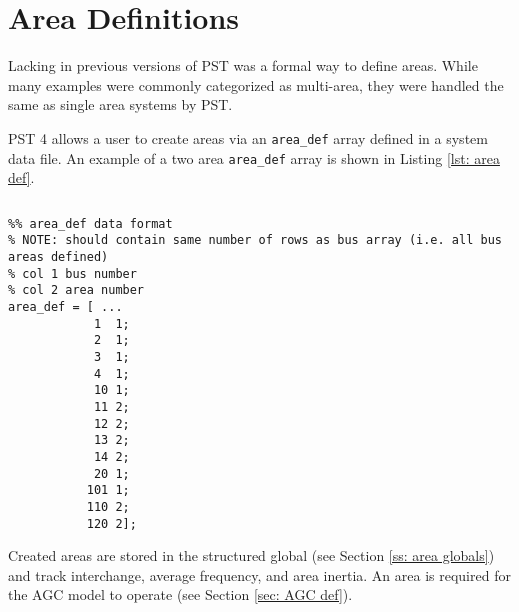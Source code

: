 \section{Area Definitions}  
Lacking in previous versions of PST was a formal way to define areas.
While many examples were commonly categorized as multi-area, they were handled the same as single area systems by PST.

PST 4 allows a user to create areas via an \verb|area_def| array defined in a system data file.
An example of a two area \verb|area_def| array is shown in Listing \ref{lst: area def}.

\begin{lstlisting}[caption={Area Definition Example},label={lst: area def}]
\end{lstlisting}\vspace{-2 em}
\begin{verbatim}
%% area_def data format
% NOTE: should contain same number of rows as bus array (i.e. all bus areas defined)
% col 1 bus number
% col 2 area number
area_def = [ ...
            1  1;
            2  1;
            3  1;
            4  1;
            10 1;
            11 2;
            12 2;
            13 2;
            14 2; 
            20 1;
           101 1; 
           110 2;
           120 2];
\end{verbatim}

Created areas are stored in the structured global (see Section \ref{ss: area globals}) and track interchange, average frequency, and area inertia.
An area is required for the AGC model to operate (see Section \ref{sec: AGC def}).

